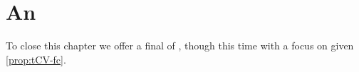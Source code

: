 \begin{note}







\end{note}


\section{An }


\begin{note}
  To close this chapter we offer a final  of \tCV{}, though this time with a focus on  given \autoref{prop:tCV-fc}.
\end{note}


